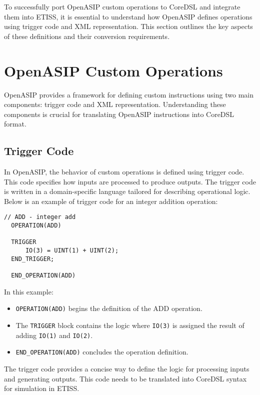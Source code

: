 To successfully port OpenASIP custom operations to CoreDSL and integrate them into ETISS,
it is essential to understand how OpenASIP defines operations using trigger code and XML representation.
This section outlines the key aspects of these definitions and their conversion requirements.

\section{OpenASIP Custom Operations}

OpenASIP provides a framework for defining custom instructions using two main components: trigger code and XML representation.
Understanding these components is crucial for translating OpenASIP instructions into CoreDSL format.

\subsection{Trigger Code}

In OpenASIP, the behavior of custom operations is defined using trigger code. This code specifies how inputs are processed to produce outputs.
The trigger code is written in a domain-specific language tailored for describing operational logic.
Below is an example of trigger code for an integer addition operation:

\begin{lstlisting}[caption={The trigger code of ADD}]
  // ADD - integer add
  OPERATION(ADD)

  TRIGGER
      IO(3) = UINT(1) + UINT(2);
  END_TRIGGER;

  END_OPERATION(ADD)
\end{lstlisting}

In this example:
\begin{itemize}
    \item \texttt{OPERATION(ADD)} begins the definition of the ADD operation.
    \item The \texttt{TRIGGER} block contains the logic where \texttt{IO(3)} is assigned the result of adding \texttt{IO(1)} and \texttt{IO(2)}.
    \item \texttt{END_OPERATION(ADD)} concludes the operation definition.
\end{itemize}

The trigger code provides a concise way to define the logic for processing inputs and generating outputs.
This code needs to be translated into CoreDSL syntax for simulation in ETISS.

